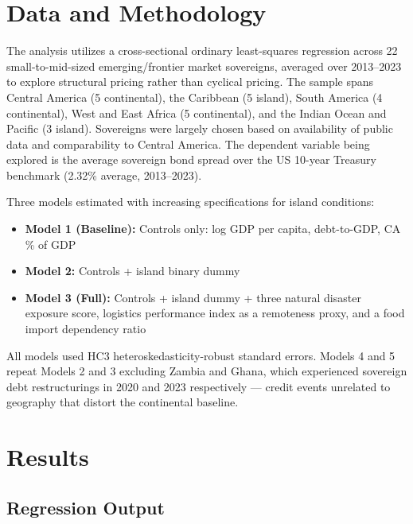\documentclass[11pt, a4paper]{article}
\begin{document}
\section{Data and Methodology}

The analysis utilizes a cross-sectional ordinary least-squares regression across 22 small-to-mid-sized emerging/frontier market sovereigns, averaged over 2013--2023 to explore structural pricing rather than cyclical pricing. The sample spans Central America (5 continental), the Caribbean (5 island), South America (4 continental), West and East Africa (5 continental), and the Indian Ocean and Pacific (3 island). Sovereigns were largely chosen based on availability of public data and comparability to Central America. The dependent variable being explored is the average sovereign bond spread over the US 10-year Treasury benchmark (2.32\% average, 2013--2023).

Three models estimated with increasing specifications for island conditions:

\begin{itemize}
    \item \textbf{Model 1 (Baseline):} Controls only: log GDP per capita, debt-to-GDP, CA \% of GDP
    \item \textbf{Model 2:} Controls + island binary dummy
    \item \textbf{Model 3 (Full):} Controls + island dummy + three natural disaster exposure score, logistics performance index as a remoteness proxy, and a food import dependency ratio
\end{itemize}

All models used HC3 heteroskedasticity-robust standard errors. Models 4 and 5 repeat Models 2 and 3 excluding Zambia and Ghana, which experienced sovereign debt restructurings in 2020 and 2023 respectively --- credit events unrelated to geography that distort the continental baseline.

\section{Results}

\subsection{Regression Output}
\end{document}
